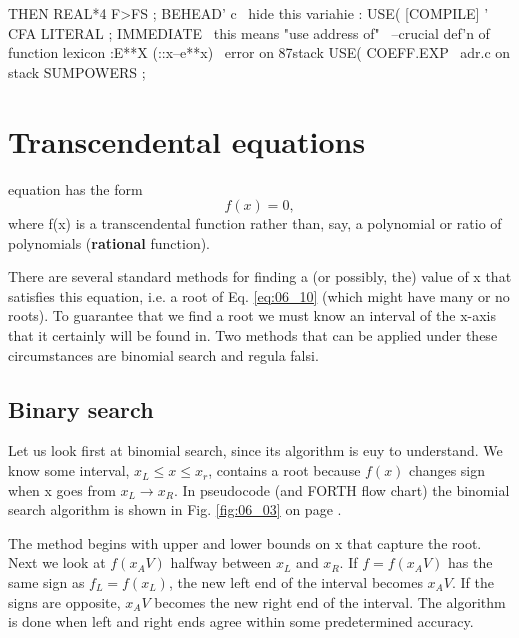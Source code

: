     THEN REAL*4 F>FS ;
BEHEAD' c \ hide this variahie
: USE( [COMPILE] ' CFA LITERAL ;
    IMMEDIATE
\ this means "use address of"
\ --crucial def'n of function lexicon
:E**X (::x--e**x) %
            \ error on 87stack
    USE( COEFF.EXP
            \ adr.c on stack
    SUMPOWERS ;

\section{Transcendental equations}

 equation has the form
\begin{equation}
f(x) = 0,
    \label{eq:06_10}
\end{equation}
where f(x) is a transcendental function rather than, say, a polynomial or ratio of polynomials (\textbf{rational} function).

There are several standard methods for finding a (or possibly, the) value of x that satisfies this equation, i.e. a root of Eq. \ref{eq:06_10} (which might have many or no roots). To guarantee that we find a root we must know an interval of the x-axis that it certainly will be found in. Two methods that can be applied under these circumstances are binomial search and regula falsi.

\subsection{Binary search}

Let us look first at binomial search, since its algorithm is euy to understand. We know some interval, $x_L \leq x \leq x_r$, contains a root because $f(x)$ changes sign when x goes from $x_L \rightarrow x_R$. In pseudocode (and FORTH flow chart) the binomial search algorithm is shown in Fig. \ref{fig:06_03} on page \pageref{fig:06_03}.

The method begins with upper and lower bounds on x that capture the root. Next we look at $f(x_AV)$ halfway between $x_L$ and $x_R$. If $f=f(x_AV)$ has the same sign as $f_L = f(x_L)$, the new left end of the interval becomes $x_AV$. If the signs are opposite, $x_AV$ becomes the new right end of the interval. The algorithm is done when left and right ends agree within some predetermined accuracy.

